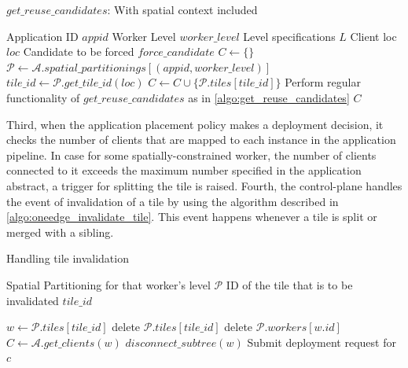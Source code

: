 \begin{algorithm}
\caption{$get\_reuse\_candidates$: With spatial context included}
\begin{algorithmic}[1]
\Require Application ID $appid$
\Require Worker Level $worker\_level$
\Require Level specifications $L$
\Require Client loc $loc$
\Require Candidate to be forced $force\_candidate$
\State $C \gets \{\}$
    \State $\mathcal{P} \gets \mathcal{A}.spatial\_partitionings[\left( appid, worker\_level\right)]$
    \State $tile\_id \gets \mathcal{P}.get\_tile\_id \left( loc \right)$
            \State $C \gets C \cup \{ \mathcal{P}.tiles[tile\_id] \}$
        \EndIf
    \EndIf
\Else
    \State Perform regular functionality of $get\_reuse\_candidates$ as in \cref{algo:get_reuse_candidates}
\EndIf
\State \Return $C$
\end{algorithmic}
\end{algorithm}
Third, when the application placement policy makes a deployment decision, it checks the number of clients that are mapped to each instance in the application pipeline. In case for some spatially-constrained worker, the number of clients connected to it exceeds the maximum number specified in the application abstract, a trigger for splitting the tile is raised. Fourth, the control-plane handles the event of invalidation of a tile by using the algorithm described in \cref{algo:oneedge_invalidate_tile}. This event happens whenever a tile is split or merged with a sibling.

\begin{algorithm}
\caption{Handling tile invalidation}
\label{algo:oneedge_invalidate_tile}
\begin{algorithmic}[1]
\Require Spatial Partitioning for that worker's level $\mathcal{P}$
\Require ID of the tile that is to be invalidated $tile\_id$

\State $w \gets \mathcal{P}.tiles [tile\_id]$
\State delete $\mathcal{P}.tiles[tile\_id]$
\State delete $\mathcal{P}.workers[w.id]$
\State $C \gets \mathcal{A}.get\_clients \left( w \right)$ 
\State $disconnect\_subtree \left( w \right)$ 
    \State Submit deployment request for $c$
\EndFor
\end{algorithmic}
\end{algorithm}


